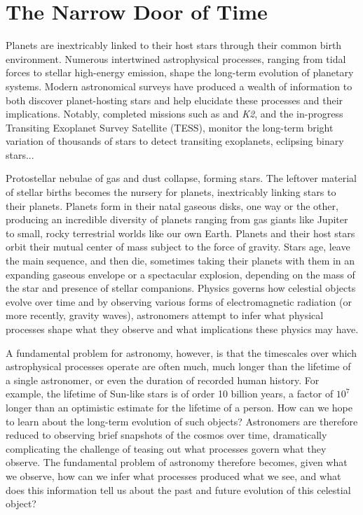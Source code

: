 
\section{The Narrow Door of Time}

Planets are inextricably linked to their host stars through their common birth environment.  Numerous intertwined astrophysical processes, ranging from tidal forces to stellar high-energy emission, shape the long-term evolution of planetary systems. Modern astronomical surveys have produced a wealth of information to both discover planet-hosting stars and help elucidate these processes and their implications. Notably, completed missions such as \kepler and \textit{K2}, and the in-progress Transiting Exoplanet Survey Satellite (TESS), monitor the long-term bright variation of thousands of stars to detect transiting exoplanets, eclipsing binary stars...

Protostellar nebulae of gas and dust collapse, forming stars. The leftover material of stellar births becomes the nursery for planets, inextricably linking stars to their planets. Planets form in their natal gaseous disks, one way or the other, producing an incredible diversity of planets ranging from gas giants like Jupiter to small, rocky terrestrial worlds like our own Earth. Planets and their host stars orbit their mutual center of mass subject to the force of gravity. Stars age, leave the main sequence, and then die, sometimes taking their planets with them in an expanding gaseous envelope or a spectacular explosion, depending on the mass of the star and presence of stellar companions. Physics governs how celestial objects evolve over time and by observing various forms of electromagnetic radiation (or more recently, gravity waves), astronomers attempt to infer what physical processes shape what they observe and what implications these physics may have.

A fundamental problem for astronomy, however, is that the timescales over which astrophysical processes operate are often much, much longer than the lifetime of a single astronomer, or even the duration of recorded human history. For example, the lifetime of Sun-like stars is of order 10 billion years, a factor of $10^7$ longer than an optimistic estimate for the lifetime of a person. How can we hope to learn about the long-term evolution of such objects? Astronomers are therefore reduced to observing brief snapshots of the cosmos over time, dramatically complicating the challenge of teasing out what processes govern what they observe. The fundamental problem of astronomy therefore becomes, given what we observe, how can we infer what processes produced what we see, and what does this information tell us about the past and future evolution of this celestial object? 

